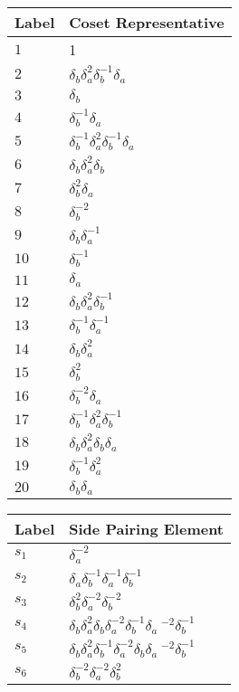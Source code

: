 \documentclass{article}
\begin{document}
\begin{center}
\begin{tabular}{ll}
\toprule
Label & Coset Representative\\
\midrule
$1$ & 1 \\
$2$ & $\delta_b^{}\delta_a^{2}\delta_b^{-1}\delta_a^{}$ \\
$3$ & $\delta_b^{}$ \\
$4$ & $\delta_b^{-1}\delta_a^{}$ \\
$5$ & $\delta_b^{-1}\delta_a^{2}\delta_b^{-1}\delta_a^{}$ \\
$6$ & $\delta_b^{}\delta_a^{2}\delta_b^{}$ \\
$7$ & $\delta_b^{2}\delta_a^{}$ \\
$8$ & $\delta_b^{-2}$ \\
$9$ & $\delta_b^{}\delta_a^{-1}$ \\
$10$ & $\delta_b^{-1}$ \\
$11$ & $\delta_a^{}$ \\
$12$ & $\delta_b^{}\delta_a^{2}\delta_b^{-1}$ \\
$13$ & $\delta_b^{-1}\delta_a^{-1}$ \\
$14$ & $\delta_b^{}\delta_a^{2}$ \\
$15$ & $\delta_b^{2}$ \\
$16$ & $\delta_b^{-2}\delta_a^{}$ \\
$17$ & $\delta_b^{-1}\delta_a^{2}\delta_b^{-1}$ \\
$18$ & $\delta_b^{}\delta_a^{2}\delta_b^{}\delta_a^{}$ \\
$19$ & $\delta_b^{-1}\delta_a^{2}$ \\
$20$ & $\delta_b^{}\delta_a^{}$ \\
\bottomrule
\end{tabular}
\hfill
\begin{tabular}{ll}
\toprule
Label & Side Pairing Element\\
\midrule
$s_{1}$ & $\delta_a^{-2}$ \\
$s_{2}$ & $\delta_a^{}\delta_b^{-1}\delta_a^{-1}\delta_b^{-1}$ \\
$s_{3}$ & $\delta_b^{2}\delta_a^{-2}\delta_b^{-2}$ \\
$s_{4}$ & $\delta_b^{}\delta_a^{2}\delta_b^{}\delta_a^{-2}\delta_b^{-1}\delta_a\
^{-2}\delta_b^{-1}$ \\
$s_{5}$ & $\delta_b^{}\delta_a^{2}\delta_b^{-1}\delta_a^{-2}\delta_b^{}\delta_a\
^{-2}\delta_b^{-1}$ \\
$s_{6}$ & $\delta_b^{-2}\delta_a^{-2}\delta_b^{2}$ \\

\end{tabular}
\end{center}
\end{document}
